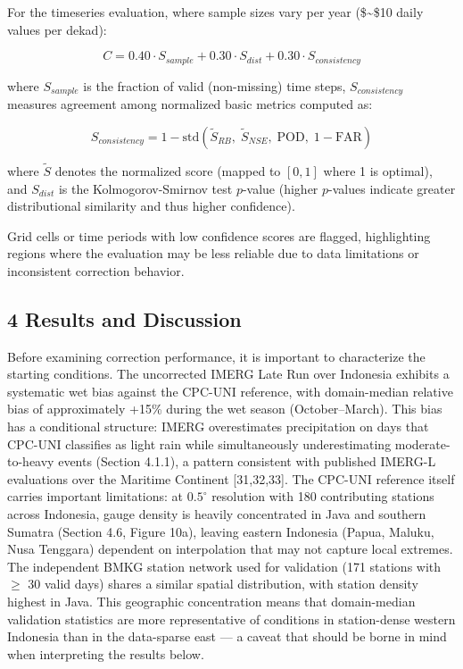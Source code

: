 \documentclass[
]{article}
\begin{document}
For the timeseries evaluation, where sample sizes vary per year
(\$\sim\$10 daily values per dekad):

\[C = 0.40 \cdot S_{sample} + 0.30 \cdot S_{dist} + 0.30 \cdot S_{consistency}\]

where \(S_{sample}\) is the fraction of valid (non-missing) time steps,
\(S_{consistency}\) measures agreement among normalized basic metrics
computed as:

\[S_{consistency} = 1 - \text{std}\left(\tilde{S}_{RB}, \; \tilde{S}_{NSE}, \; \text{POD}, \; 1 - \text{FAR}\right)\]

where \(\tilde{S}\) denotes the normalized score (mapped to \([0, 1]\)
where 1 is optimal), and \(S_{dist}\) is the Kolmogorov-Smirnov test
\(p\)-value (higher \(p\)-values indicate greater distributional
similarity and thus higher confidence).

Grid cells or time periods with low confidence scores are flagged,
highlighting regions where the evaluation may be less reliable due to
data limitations or inconsistent correction behavior.

\subsection{4 Results and Discussion}\label{results-and-discussion}

Before examining correction performance, it is important to characterize
the starting conditions. The uncorrected IMERG Late Run over Indonesia
exhibits a systematic wet bias against the CPC-UNI reference, with
domain-median relative bias of approximately +15\% during the wet season
(October--March). This bias has a conditional structure: IMERG
overestimates precipitation on days that CPC-UNI classifies as light
rain while simultaneously underestimating moderate-to-heavy events
(Section 4.1.1), a pattern consistent with published IMERG-L evaluations
over the Maritime Continent {[}31,32,33{]}. The CPC-UNI reference itself
carries important limitations: at \(0.5^{\circ}\) resolution with 180
contributing stations across Indonesia, gauge density is heavily
concentrated in Java and southern Sumatra (Section 4.6, Figure 10a),
leaving eastern Indonesia (Papua, Maluku, Nusa Tenggara) dependent on
interpolation that may not capture local extremes. The independent BMKG
station network used for validation (171 stations with \(\geq\) 30 valid
days) shares a similar spatial distribution, with station density
highest in Java. This geographic concentration means that domain-median
validation statistics are more representative of conditions in
station-dense western Indonesia than in the data-sparse east --- a
caveat that should be borne in mind when interpreting the results below.
\end{document}
